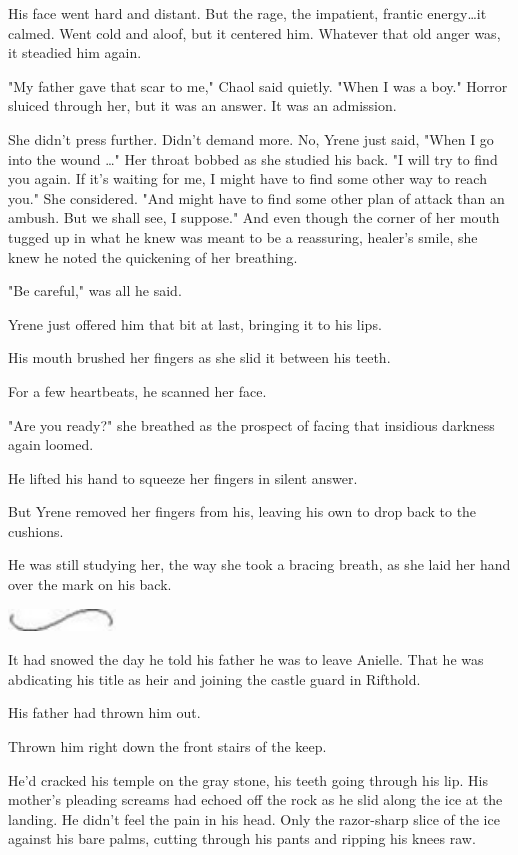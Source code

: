 His face went hard and distant.
But the rage, the impatient, frantic energy\ldots it calmed.
Went cold and aloof, but it centered him.
Whatever that old anger was, it steadied him again.

"My father gave that scar to me," Chaol said quietly.
"When I was a boy."
Horror sluiced through her, but it was an answer.
It was an admission.

She didn't press further.
Didn't demand more.
No, Yrene just said, "When I go into the wound \ldots" Her throat bobbed as she studied his back.
"I will try to find you again.
If it's waiting for me, I might have to find some other way to reach you."
She considered.
"And might have to find some other plan of attack than an ambush.
But we shall see, I suppose."
And even though the corner of her mouth tugged up in what he knew was meant to be a reassuring, healer's smile, she knew he noted the quickening of her breathing.

"Be careful," was all he said.

Yrene just offered him that bit at last, bringing it to his lips.

His mouth brushed her fingers as she slid it between his teeth.

For a few heartbeats, he scanned her face.

"Are you ready?"
she breathed as the prospect of facing that insidious darkness again loomed.

He lifted his hand to squeeze her fingers in silent answer.

But Yrene removed her fingers from his, leaving his own to drop back to the cushions.

He was still studying her, the way she took a bracing breath, as she laid her hand over the mark on his back.

\begin{center}
	\includegraphics[width=1.12in,height=0.24in]{images/seperator}
\end{center}

It had snowed the day he told his father he was to leave Anielle.
That he was abdicating his title as heir and joining the castle guard in Rifthold.

His father had thrown him out.

Thrown him right down the front stairs of the keep.

He'd cracked his temple on the gray stone, his teeth going through his lip.
His mother's pleading screams had echoed off the rock as he slid along the ice at the landing.
He didn't feel the pain in his head.
Only the razor-sharp slice of the ice against his bare palms, cutting through his pants and ripping his knees raw.

